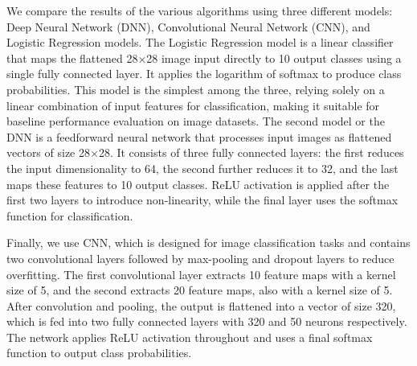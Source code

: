 \documentclass[journal]{IEEEtran}
\begin{document}
We compare the results of the various algorithms using three different models: Deep Neural Network (DNN), Convolutional Neural Network (CNN), and Logistic Regression models. The Logistic Regression model is a linear classifier that maps the flattened 28×28 image input directly to 10 output classes using a single fully connected layer. It applies the logarithm of softmax to produce class probabilities. This model is the simplest among the three, relying solely on a linear combination of input features for classification, making it suitable for baseline performance evaluation on image datasets. The second model or the DNN is a feedforward neural network that processes input images as flattened vectors of size 28×28. It consists of three fully connected layers: the first reduces the input dimensionality to 64, the second further reduces it to 32, and the last maps these features to 10 output classes. ReLU activation is applied after the first two layers to introduce non-linearity, while the final layer uses the softmax function for classification. 

Finally, we use CNN, which is designed for image classification tasks and contains two convolutional layers followed by max-pooling and dropout layers to reduce overfitting. The first convolutional layer extracts 10 feature maps with a kernel size of 5, and the second extracts 20 feature maps, also with a kernel size of 5. After convolution and pooling, the output is flattened into a vector of size 320, which is fed into two fully connected layers with 320 and 50 neurons respectively. The network applies ReLU activation throughout and uses a final softmax function to output class probabilities. 
\end{document}
